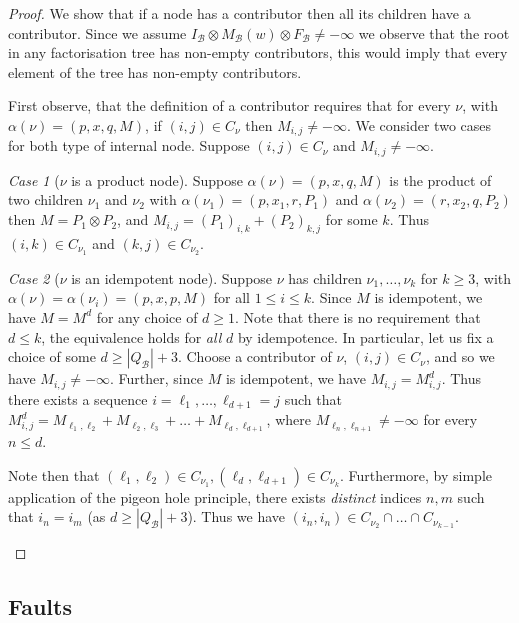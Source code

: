 \documentclass[10pt,a4paper]{amsart}
\theoremstyle{definition}
\numberwithin{equation}{section}
\theoremstyle{remark}
\newtheorem{case}{Case}
\newcommand{\autB}{\mathcal{B}}
\theoremstyle{remark}
\begin{document}
\begin{proof}
We show that if a node has a contributor then all its children have a contributor. Since we assume $I_\autB \otimes M_\autB(w)\otimes F_\autB\ne-\infty$ we observe that the root in any factorisation tree has non-empty contributors, this would imply that every element of the tree has non-empty contributors.

First observe, that the definition of a contributor requires that for every $\nu$, with $\alpha(\nu) = (p,x,q,M)$, if $(i,j)\in C_\nu$ then $M_{i,j}\ne -\infty$. We consider two cases for both type of internal node. Suppose $(i,j) \in C_{\nu}$ and $M_{i,j}\ne-\infty$. 

\begin{case}[$\nu$ is a product node]Suppose  $\alpha(\nu) = (p,x,q,M)$ is the product of two children  $\nu_1$ and $\nu_2$ with $\alpha(\nu_1) = (p,x_1,r,P_1)$ and $\alpha(\nu_2) = (r,x_2,q,P_2)$ then $M = P_1\otimes P_2$, and $M_{i,j} = (P_1)_{i,k}+ (P_2)_{k,j}$ for some $k$. Thus $(i,k)\in C_{\nu_1}$ and $(k,j) \in C_{\nu_2}$.
\end{case}
\begin{case}[$\nu$ is an idempotent node] Suppose $\nu$ has children $\nu_1,\dots, \nu_k$ for $k\ge 3$, with $\alpha(\nu) = \alpha(\nu_i) = (p,x,p,M)$ for all $1\le i\le k$.
Since $M$ is idempotent, we have $M = M^d$ for any choice of $d\ge 1$. Note that there is no requirement that $d\le k$, the equivalence holds for \emph{all} $d$ by idempotence.
In particular, let us fix a choice of some $d\ge |Q_\autB| + 3$.
Choose a contributor of $\nu$, $(i,j) \in C_{\nu}$, and so we have $M_{i,j} \ne -\infty$. Further, since $M$ is idempotent, we have $M_{i,j} = M^{d}_{i,j}$. Thus there exists a sequence $i = \ell_1,\dots,\ell_{d+1}=j$ such that $M^{d}_{i,j} = M_{\ell_1,\ell_2} + M_{\ell_2,\ell_3} + \dots + M_{\ell_{d},\ell_{d+1}}$, where $M_{\ell_n,\ell_{n+1}} \ne -\infty$ for every $n\le d$.  

 Note then that $(\ell_1,\ell_2) \in C_{\nu_1}, (\ell_{d},\ell_{d+1}) \in C_{\nu_k}$.
 Furthermore, by simple application of the pigeon hole principle, there exists \emph{distinct} indices $n,m$ such that $i_n = i_m$ (as $d \ge |Q_\autB|+3$). Thus we have $(i_n,i_n) \in C_{\nu_2}\cap \dots\cap C_{\nu_{k-1}}$.\qedhere
\end{case}
\end{proof}

\subsection{Faults}
\end{document}

